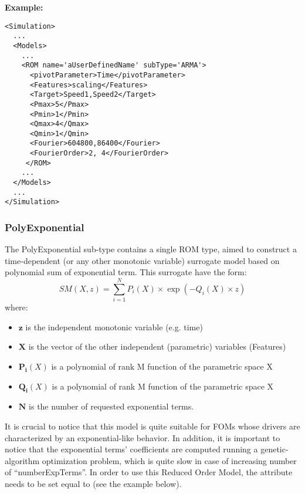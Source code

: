 \textbf{Example:}
\begin{lstlisting}[style=XML,morekeywords={name,subType}]
<Simulation>
  ...
  <Models>
    ...
    <ROM name='aUserDefinedName' subType='ARMA'>
      <pivotParameter>Time</pivotParameter>
      <Features>scaling</Features>
      <Target>Speed1,Speed2</Target>
      <Pmax>5</Pmax>
      <Pmin>1</Pmin>
      <Qmax>4</Qmax>
      <Qmin>1</Qmin>
      <Fourier>604800,86400</Fourier>
      <FourierOrder>2, 4</FourierOrder>
     </ROM>
    ...
  </Models>
  ...
</Simulation>
\end{lstlisting}

\subsubsection{PolyExponential}
\label{subsubsec:polyexponential}
The PolyExponential sub-type contains a single ROM type, aimed to construct a time-dependent (or any other monotonic
variable) surrogate model based on polynomial sum of exponential term. This surrogate have the form:
%
\begin{equation}
  SM(X,z) = \sum_{i=1}^{N} P_{i}(X) \times \exp ( - Q_{i}(X) \times z )
\end{equation}
where:
\begin{itemize}
  \item $\mathbf{z}$ is the independent  monotonic variable (e.g. time)
  \item $\mathbf{X}$  is the vector of the other independent (parametric) variables  (Features)
  \item $\mathbf{P_{i}}(X)$ is a polynomial of rank M function of the parametric space X
  \item  $\mathbf{Q_{i}}(X)$ is a polynomial of rank M function of the parametric space X
  \item  $\mathbf{N}$ is the number of requested exponential terms.
\end{itemize}
It is crucial to notice that this model is quite suitable for FOMs whose drivers are characterized by an exponential-like behavior.
In addition, it is important to notice that the exponential terms' coefficients are computed running a genetic-algorithm optimization
problem, which is quite slow in case of increasing number of ``numberExpTerms''.
%
In order to use this Reduced Order Model, the  attribute
 needs to be set equal to  (see the example
below).
%
\subnodeIntro

